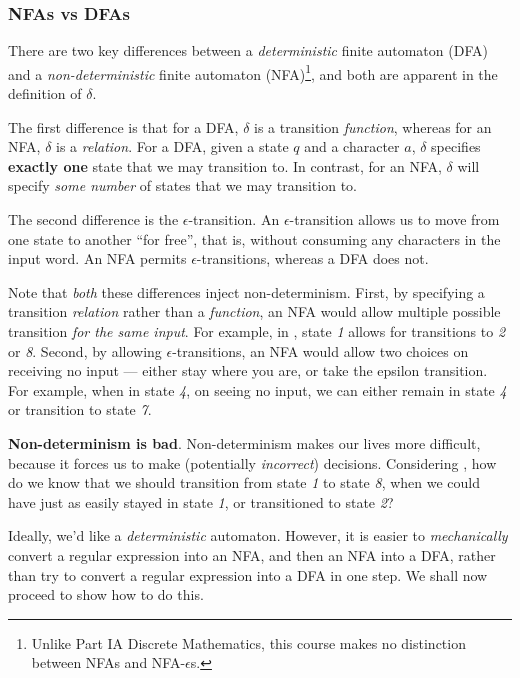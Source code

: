 \subsubsection{NFAs vs DFAs}
There are two key differences between a \textit{deterministic} finite automaton (DFA) and a \textit{non-deterministic} finite automaton (NFA)\footnote{Unlike {\sffamily Part IA Discrete Mathematics}, this course makes no distinction between NFAs and NFA-$\epsilon$s.}, and both are apparent in the definition of $\delta$. 

The first difference is that for a DFA, $\delta$ is a transition \emph{function}, whereas for an NFA, $\delta$ is a \emph{relation}. For a DFA, given a state $q$ and a character $a$, $\delta$ specifies \textbf{exactly one} state that we may transition to. In contrast, for an NFA, $\delta$ will specify \emph{some number} of states that we may transition to.

The second difference is the $\epsilon$-transition. An $\epsilon$-transition allows us to move from one state to another ``for free'', that is, without consuming any characters in the input word. An NFA permits $\epsilon$-transitions, whereas a DFA does not. 

Note that \emph{both} these differences inject non-determinism. First, by specifying a transition \emph{relation} rather than a \emph{function}, an NFA would allow multiple possible transition \emph{for the same input}. For example, in , state \textit{1} allows for transitions to \textit{2} or \textit{8}. Second, by allowing $\epsilon$-transitions, an NFA would allow two choices on receiving no input --- either stay where you are, or take the epsilon transition. For example, when in state \textit{4}, on seeing no input, we can either remain in state \textit{4} or transition to state \textit{7}.

\textbf{Non-determinism is bad}. Non-determinism makes our lives more difficult, because it forces us to make (potentially \emph{incorrect}) decisions. Considering , how do we know that we should transition from state \textit{1} to state \textit{8}, when we could have just as easily stayed in state \textit{1}, or transitioned to state \textit{2}?

Ideally, we'd like a \emph{deterministic} automaton. However, it is easier to \emph{mechanically} convert a regular expression into an NFA, and then an NFA into a DFA, rather than try to convert a regular expression into a DFA in one step. We shall now proceed to show how to do this.


